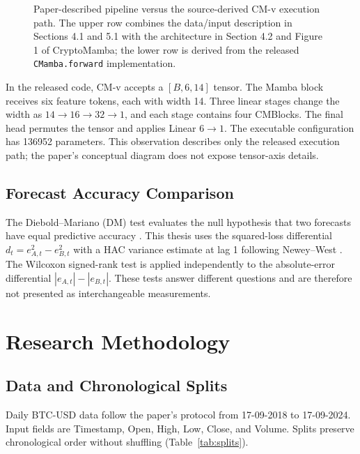 \documentclass[13pt,a4paper,oneside]{report}
\begin{document}
\begin{figure}[H]
\centering
\resizebox{\linewidth}{!}{}
\caption[Paper diagram and released CM-v execution]{Paper-described pipeline versus the
source-derived CM-v execution path. The upper row combines the data/input description in Sections
4.1 and 5.1 with the architecture in Section 4.2 and Figure 1 of CryptoMamba; the lower row is
derived from the released \texttt{CMamba.forward} implementation.}
\label{fig:paper-source-architecture}
\end{figure}

In the released code, CM-v accepts a $[B,6,14]$ tensor. The Mamba block receives six feature tokens,
each with width 14. Three linear stages change the width as $14\to16\to32\to1$, and each stage
contains four CMBlocks. The final head permutes the tensor and applies Linear $6\to1$. The
executable configuration has \num{136952} parameters. This observation describes only the released
execution path; the paper's conceptual diagram does not expose tensor-axis details.

\section{Forecast Accuracy Comparison}\label{sec:stats-background}
The Diebold--Mariano (DM) test evaluates the null hypothesis that two forecasts have equal
predictive accuracy \cite{dm}. This thesis uses the squared-loss differential
$d_t=e_{A,t}^{2}-e_{B,t}^{2}$ with a HAC variance estimate at lag 1 following Newey--West
\cite{neweywest}. The Wilcoxon signed-rank test \cite{wilcoxon} is applied independently to the
absolute-error differential $|e_{A,t}|-|e_{B,t}|$. These tests answer different questions and are
therefore not presented as interchangeable measurements.

\chapter{Research Methodology}\label{chap:method}

\section{Data and Chronological Splits}\label{sec:data}
Daily BTC-USD data follow the paper's protocol from 17-09-2018 to 17-09-2024. Input fields are
Timestamp, Open, High, Low, Close, and Volume. Splits preserve chronological order without
shuffling (Table~\ref{tab:splits}).
\end{document}
